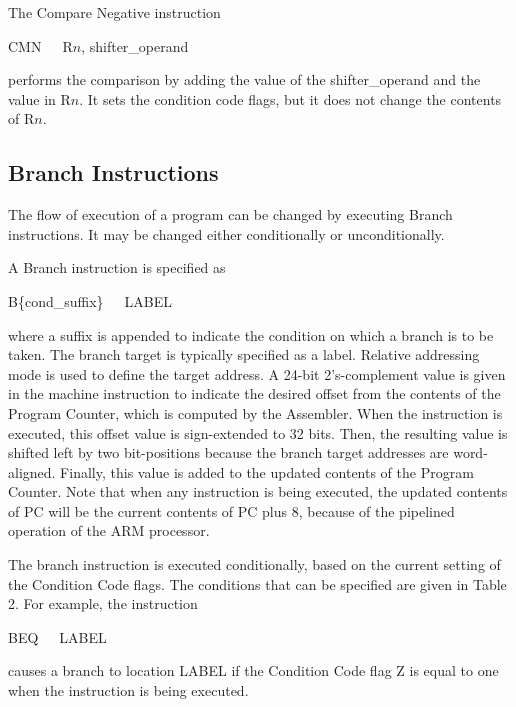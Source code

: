 \documentclass[11pt, twoside, pdftex]{article}
\begin{document}
The Compare Negative instruction
\begin{center}
CMN~~~R$n$, shifter\_operand
\end{center}
\noindent 
performs the comparison by adding the value of the 
shifter\_operand and the value in R$n$. It sets the condition
code flags, but it does not change the contents of R$n$.

\subsection{Branch Instructions}

The flow of execution of a program can be changed by executing Branch instructions.
It may be changed either conditionally or unconditionally.
 
A Branch instruction is specified as 
\begin{center}
B\{cond\_suffix\}~~~LABEL
\end{center}
\noindent
where a suffix is appended to indicate the condition on which a
branch is to be taken. The branch target is typically specified
as a label. Relative addressing mode is used to define the target
address. A 24-bit 2's-complement value is given in the machine
instruction to indicate the desired offset from the
contents of the Program Counter, which is computed by the
Assembler. When the instruction is executed, this offset value is sign-extended to 32 bits.
Then, the resulting value is shifted left by two bit-positions
because the branch target addresses are word-aligned. Finally,
this value is added to the updated contents of the Program
Counter. Note that when any instruction is being executed, the
updated contents of PC will be the current contents of PC plus 8,
because of the pipelined operation of the ARM processor. 

The branch instruction is executed conditionally, based on the
current setting of the Condition Code flags. The conditions that
can be specified are given in Table 2. For example, the
instruction
\begin{center}
BEQ~~~LABEL
\end{center}
\noindent
causes a branch to location LABEL if the Condition Code flag Z
is equal to one when the instruction is being executed.

\newcommand{\vs}{\rule{0pt}{1ex}\\}
\end{document}
